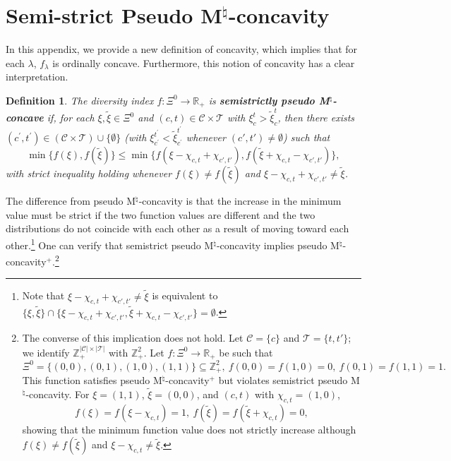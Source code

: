 \documentclass[12pt]{amsart}
\newtheorem{definition}{Definition}
\theoremstyle{remark}
\begin{document}
\section{Semi-strict Pseudo M$^\natural$-concavity}\label{app:semistrict}
In this appendix, we provide a new definition of concavity, which implies that for each
$\lambda$, $f_{\lambda}$ is ordinally concave. Furthermore, this notion of concavity has a
clear interpretation.


\begin{definition}\label{def:strict-pseudo}
The diversity index $f: \Xi^0 \rightarrow \mathbb{R}_+$ is \textbf{semistrictly pseudo M$^\natural$-concave} if, for each
$\xi, \tilde{\xi} \in \Xi^0$ and $(c, t) \in \mathcal{C} \times \mathcal{T}$ with $\xi_c^t>\tilde{\xi}_{c}^t$, then
there exists $\left(c^{\prime}, t^{\prime}\right) \in (\mathcal{C} \times \mathcal{T})\cup\{\emptyset\}$ (with $\xi_{c^{\prime}}^{t^{\prime}}<\tilde{\xi}_{c^{\prime}}^{t^{\prime}}$ whenever $(c',t')\neq \emptyset$) such that
$$
\min\{f(\xi),f(\tilde{\xi})\}\leq\min\{f(\xi-\chi_{c,t}+\chi_{c',t'}), f(\tilde{\xi}+\chi_{c,t}-\chi_{c',t'})\},
$$
with strict inequality holding whenever $f(\xi)\neq f(\tilde \xi)$ and $\xi-\chi_{c,t}+\chi_{c',t'}\neq \tilde \xi$.
\end{definition}
The difference from pseudo M$^\natural$-concavity is that the increase in the minimum value must be strict if the two function values are different and the two distributions do not coincide with each other as a result of moving toward each other.\footnote{Note that $\xi-\chi_{c,t}+\chi_{c',t'}\neq \tilde \xi$ is equivalent to $\{\xi, \tilde \xi\}\cap \{\xi-\chi_{c,t}+\chi_{c',t'}, \tilde \xi+\chi_{c,t}-\chi_{c',t'}\}=\emptyset$.} One can verify that semistrict pseudo M$^\natural$-concavity implies pseudo M$^\natural$-concavity$^+$.\footnote{The converse of this implication does not hold. Let $\mathcal{C}=\{c\}$ and $\mathcal{T}=\{t,t'\}$; we identify $\mathbb{Z}^{|\mathcal{C}|\times |\mathcal{T}|}_+$ with $\mathbb{Z}^2_+$. Let $f:\Xi^0\rightarrow \mathbb{R}_+$ be such that
$$
\Xi^0=\{(0,0),(0,1),(1,0),(1,1)\}\subseteq \mathbb{Z}^2_+, \: f(0,0)=f(1,0)=0, \:  f(0,1)=f(1,1)=1.
$$
This function satisfies pseudo M$^\natural$-concavity$^+$ but violates semistrict pseudo M$^\natural$-concavity. For $\xi=(1,1)$, $\tilde \xi=(0,0)$, and $(c,t)$ with $\chi_{c,t}=(1,0)$,
$$
f(\xi)=f(\xi-\chi_{c,t})=1, \: f(\tilde \xi)=f(\tilde \xi+\chi_{c,t})=0,
$$
showing that the minimum function value does not strictly increase although $f(\xi)\neq f(\tilde \xi)$ and $\xi-\chi_{c,t}\neq \tilde \xi$.
}
\end{document}
